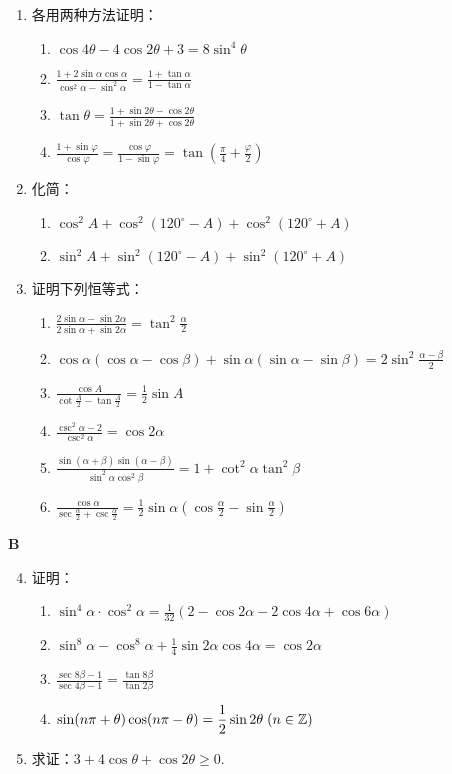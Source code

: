 \begin{enumerate}
    \item 各用两种方法证明：
\begin{enumerate}[(1)]
    \item $\cos4\theta-4\cos2\theta+3=8\sin^4\theta$
    \item $\frac{1+2\sin\alpha\cos\alpha}{\cos^2\alpha-\sin^2\alpha}=\frac{1+\tan\alpha}{1-\tan\alpha}$
    \item $\tan\theta=\frac{1+\sin2\theta-\cos2\theta}{1+\sin2\theta+\cos2\theta}$
    \item $\frac{1+\sin\varphi}{\cos\varphi}=\frac{\cos\varphi}{1-\sin\varphi}=\tan\left(\frac{\pi}{4}+\frac{\varphi}{2}\right)$
\end{enumerate}
\item 化简：
\begin{enumerate}[(1)]
    \item $\cos^2A+\cos^2(120^{\circ}-A)+\cos^2(120^{\circ}+A)$
    \item $\sin^2A+\sin^2(120^{\circ}-A)+\sin^2(120^{\circ}+A)$
\end{enumerate}
\item 证明下列恒等式：
\begin{enumerate}[(1)]
    \item $\frac{2\sin\alpha-\sin2\alpha}{2\sin\alpha+\sin2\alpha}=\tan^2\frac{\alpha}{2}$
    \item $\cos\alpha(\cos\alpha-\cos\beta)+\sin\alpha(\sin\alpha-\sin\beta)=2\sin^2 \frac{\alpha-\beta}{2}$
    \item $\frac{\cos A}{\cot\frac{A}{2}-\tan\frac{A}{2}}=\frac{1}{2}\sin A$
    \item $\frac{\csc^2\alpha-2}{\csc^2\alpha}=\cos2\alpha$
    \item $\frac{\sin(\alpha+\beta)\sin(\alpha-\beta)}{\sin^2\alpha\cos^2\beta}=1+\cot^2\alpha\tan^2\beta$
    \item $\frac{\cos\alpha}{\sec\frac{\alpha}{2}+\csc\frac{\alpha}{2}}=\frac{1}{2}\sin\alpha\left(\cos\frac{\alpha}{2}-\sin\frac{\alpha}{2}\right)$
\end{enumerate}
\end{enumerate}

\begin{center}
    \bfseries B
\end{center}
\begin{enumerate}\setcounter{enumi}{3}
    \item 证明： \begin{enumerate}[(1)]
        \item $\sin^4\alpha\cdot \cos^2\alpha=\frac{1}{32}(2-\cos2\alpha-2\cos4\alpha+\cos6\alpha)$
        \item $\sin^8\alpha-\cos^8\alpha+\frac{1}{4}\sin2\alpha\cos4\alpha=\cos2\alpha$
        \item $\frac{\sec8\beta-1}{\sec4\beta-1}=\frac{\tan8\beta}{\tan2\beta}$
        \item $\sin(n\pi+\theta)\cos(n\pi-\theta)=\dfrac{1}{2}\sin2\theta\; (n\in\mathbb{Z})$
    \end{enumerate}
    \item 求证：$3+4\cos\theta+\cos2\theta\ge 0$.
\end{enumerate}


